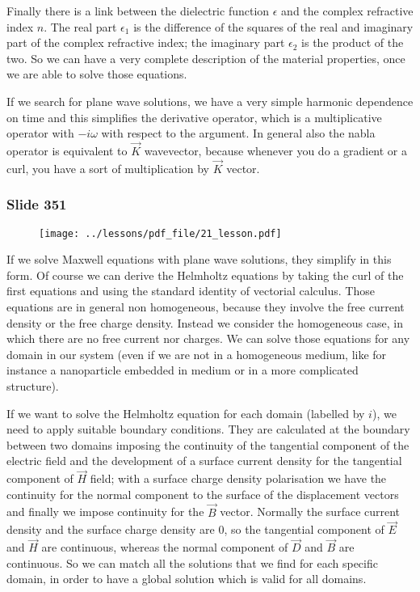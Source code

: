 \documentclass[../main/main.tex]{subfiles}
\begin{document}
Finally there is a link between the dielectric function $\epsilon$ and the complex refractive index $n$. 
The real part $\epsilon_1$ is the difference of the squares of the real and imaginary part of the complex refractive index; the imaginary part $\epsilon_2$ is the product of the two.
So we can have a very complete description of the material properties, once we are able to solve those equations.

If we search for plane wave solutions, we have a very simple harmonic dependence on time and this simplifies the derivative operator, which is a multiplicative operator with $-i \omega$ with respect to the argument.
In general also the nabla operator is equivalent to $\vec{K}$ wavevector, because whenever you do a gradient or a curl, you have a sort of multiplication by $\vec{K}$ vector. 


\newpage 

\subsubsection{Slide 351}

\begin{figure}[h!]
\centering
\texttt{[image: ../lessons/pdf\_file/21\_lesson.pdf]}
\end{figure}


If we solve Maxwell equations with plane wave solutions, they simplify in this form.
Of course we can derive the Helmholtz equations by taking the curl of the first equations and using the standard identity of vectorial calculus.
Those equations are in general non homogeneous, because they involve the free current density or the free charge density. 
Instead we consider the homogeneous case, in which there are no free current nor charges. 
We can solve those equations for any domain in our system (even if we are not in a homogeneous medium, like for instance a nanoparticle embedded in medium or in a more complicated structure).

If we want to solve the Helmholtz equation for each domain (labelled by $i$), we need to apply suitable boundary conditions. They are calculated at the boundary between two domains imposing the continuity of the tangential component of the electric field and the development of a surface current density for the tangential component of $\vec{H}$ field; with a surface charge density polarisation we have the continuity for the normal component to the surface of the displacement vectors and finally we impose continuity for the $\vec{B}$ vector.
Normally the surface current density and the surface charge density are 0, so the tangential component of $\vec{E}$ and $\vec{H}$ are continuous, whereas the normal component of $\vec{D}$ and $\vec{B}$ are continuous.
So we can match all the solutions that we find for each specific domain, in order to have a global solution which is valid for all domains.
\end{document}
